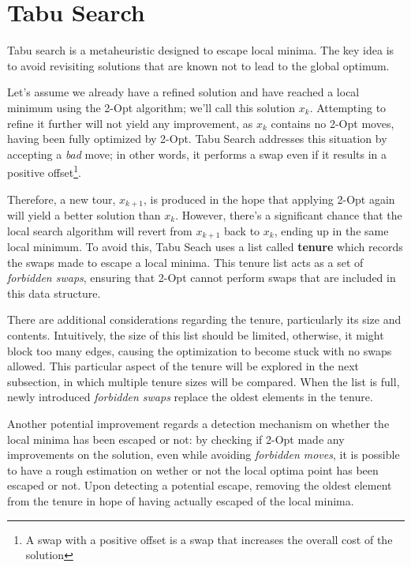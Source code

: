\section{Tabu Search}

Tabu search is a metaheuristic designed to escape local minima.
The key idea is to avoid revisiting solutions that are known not to lead to the global optimum.

Let's assume we already have a refined solution and have reached a local minimum using the 2-Opt algorithm; we'll call this solution $x_k$.
Attempting to refine it further will not yield any improvement, as $x_k$ contains no 2-Opt moves, having been fully optimized by 2-Opt.
Tabu Search addresses this situation by accepting a \textit{bad} move; in other words, it performs a swap even if it results in a positive offset\footnote{A swap with a positive offset is a swap that increases the overall cost of the solution}.

Therefore, a new tour, $x_{k+1}$, is produced in the hope that applying 2-Opt again will yield a better solution than $x_k$.
However, there's a significant chance that the local search algorithm will revert from $x_{k+1}$ back to $x_k$, ending up in the same local minimum.
To avoid this, Tabu Seach uses a list called \textbf{tenure} which records the swaps made to escape a local minima.
This tenure list acts as a set of \textit{forbidden swaps}, ensuring that 2-Opt cannot perform swaps that are included in this data structure.

There are additional considerations regarding the tenure, particularly its size and contents.
Intuitively, the size of this list should be limited, otherwise, it might block too many edges, causing the optimization to become stuck with no swaps allowed.
This particular aspect of the tenure will be explored in the next subsection, in which multiple tenure sizes will be compared.
When the list is full, newly introduced \textit{forbidden swaps} replace the oldest elements in the tenure.

Another potential improvement regards a detection mechanism on whether the local minima has been escaped or not: by checking if 2-Opt made any improvements on the solution, even while avoiding \textit{forbidden moves}, it is possible to have a rough estimation on wether or not the local optima point has been escaped or not.
Upon detecting a potential escape, removing the oldest element from the tenure in hope of having actually escaped of the local minima.

